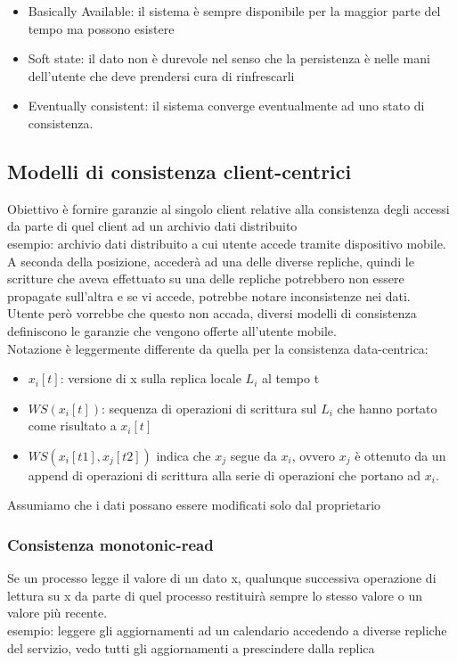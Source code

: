 \documentclass[16px]{article}
\begin{document}
\begin{itemize}
\item Basically Available: il sistema è sempre disponibile per la maggior parte del tempo ma possono esistere
\item Soft state: il dato non è durevole nel senso che la persistenza è nelle mani dell'utente che deve prendersi cura di rinfrescarli
\item Eventually consistent: il sistema converge eventualmente ad uno stato di consistenza.
\end{itemize}
\subsection{Modelli di consistenza client-centrici}
Obiettivo è fornire garanzie al singolo client relative alla consistenza degli accessi da parte di quel client ad un archivio dati distribuito\\ esempio: archivio dati distribuito a cui utente accede tramite dispositivo mobile. A seconda della posizione, accederà ad una delle diverse repliche, quindi le scritture che aveva effettuato su una delle repliche potrebbero non essere propagate sull'altra e se vi accede, potrebbe notare inconsistenze nei dati.\\ Utente però vorrebbe che questo non accada, diversi modelli di consistenza definiscono le garanzie che vengono offerte all'utente mobile.\\ Notazione è leggermente differente da quella per la consistenza data-centrica:
\begin{itemize}
\item $x_i[t]$: versione di x sulla replica locale $L_i$ al tempo t
\item $WS(x_i[t])$: sequenza di operazioni di scrittura sul $L_i$ che hanno portato come risultato a $x_i[t]$
\item $WS(x_i[t1], x_j[t2])$ indica che $x_j$ segue da $x_i$, ovvero $x_j$ è ottenuto da un append di operazioni di scrittura alla serie di operazioni che portano ad $x_i$.
\end{itemize}
Assumiamo che i dati possano essere modificati solo dal proprietario
\subsubsection{Consistenza monotonic-read}
Se un processo legge il valore di un dato x, qualunque successiva operazione di lettura su x da parte di quel processo restituirà sempre lo stesso valore o un valore più recente.\\ esempio: leggere gli aggiornamenti ad un calendario accedendo a diverse repliche del servizio, vedo tutti gli aggiornamenti a prescindere dalla replica
\end{document}
